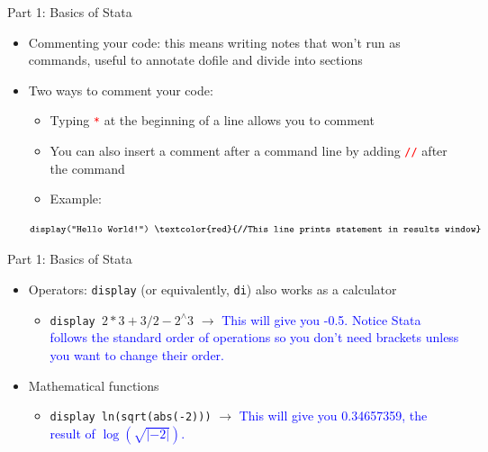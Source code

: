 \documentclass[11pt,notes=hide,aspectratio=169,mathserif]{beamer}
\begin{document}
\begin{frame}{Part 1: Basics of Stata}
    \begin{itemize}
        \item Commenting your code: this means writing notes that won't run as commands, useful to annotate dofile and divide into sections \medskip
        \item Two ways to comment your code:\smallskip
        \begin{itemize}
            \item  Typing \textcolor{red}{\texttt{*}} at the beginning of a line allows you to comment \smallskip
            \item You can also insert a comment after a command line by adding \textcolor{red}{\texttt{//}} after the command\smallskip
            \item Example: \smallskip
                    \end{itemize}
            $$\footnotesize \texttt{display("Hello World!") \textcolor{red}{//This line prints statement in results window}}$$
       
    \end{itemize}
\end{frame}

\begin{frame}{Part 1: Basics of Stata}
\begin{itemize}
    \item Operators: \texttt{display} (or equivalently, \texttt{di}) also works as a calculator \smallskip
    \begin{itemize}
        \item \texttt{display $2*3 + 3/2 - 2^{\wedge} 3$} $\rightarrow$ \textcolor{blue}{This will give you -0.5. Notice Stata follows the standard order of operations so you don't need brackets unless you want to change their order.}
    \end{itemize}\bigskip
    \item Mathematical functions\smallskip
\begin{itemize}
\item \texttt{display ln(sqrt(abs(-2)))} $\rightarrow$ \textcolor{blue}{This will give you 0.34657359, the result of $\log(\sqrt{|-2|})$. } 
\end{itemize}
\end{itemize}
\end{frame}
\end{document}
